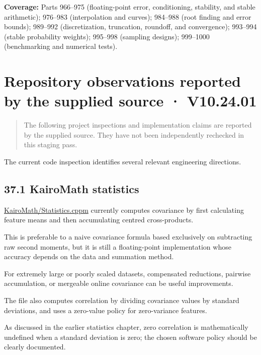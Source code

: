 \textbf{Coverage:} Parts 966--975 (floating-point error, conditioning, stability, and stable arithmetic); 976--983 (interpolation and curves); 984--988 (root finding and error bounds); 989--992 (discretization, truncation, roundoff, and convergence); 993--994 (stable probability weights); 995--998 (sampling designs); 999--1000 (benchmarking and numerical tests).

\section{Repository observations reported by the supplied source · V10.24.01}\label{02-foundations-ii-ch039-repository-observations-reported-by-the-supplied-source-v10.24.01}

\begin{quote}
The following project inspections and implementation claims are reported by the supplied source. They have not been independently rechecked in this staging pass.
\end{quote}

The current code inspection identifies several relevant engineering directions.

\subsection{37.1 KairoMath statistics}\label{02-foundations-ii-ch039-kairomath-statistics-1}

\href{https://github.com/swayam8624/KairoMath/blob/master/Statistics.cppm?utm_source=chatgpt.com}{KairoMath/Statistics.cppm} currently computes covariance by first calculating feature means and then accumulating centred cross-products.

This is preferable to a naive covariance formula based exclusively on subtracting raw second moments, but it is still a floating-point implementation whose accuracy depends on the data and summation method.

For extremely large or poorly scaled datasets, compensated reductions, pairwise accumulation, or mergeable online covariance can be useful improvements.

The file also computes correlation by dividing covariance values by standard deviations, and uses a zero-value policy for zero-variance features.

As discussed in the earlier statistics chapter, zero correlation is mathematically undefined when a standard deviation is zero; the chosen software policy should be clearly documented.

